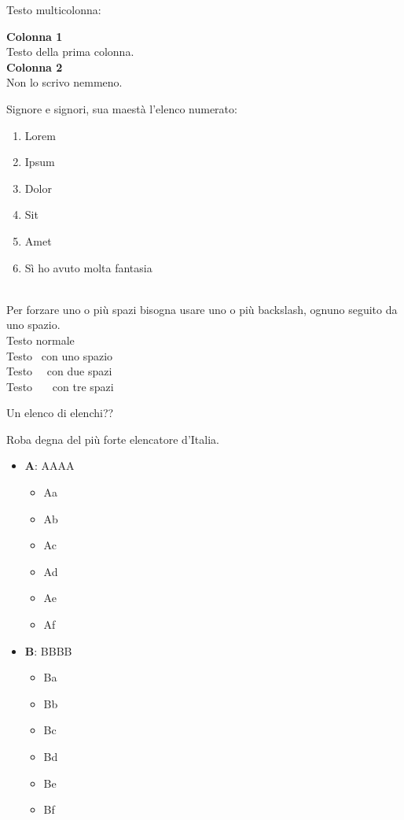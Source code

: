 \documentclass[envcountsame,envcountchap]{svmono}
\begin{document}
\vspace{0.5cm}



Testo multicolonna: 

\begin{multicols}{2}
    \textbf{Colonna 1}\\
    Testo della prima colonna.
\columnbreak\\
    \textbf{Colonna 2}\\
    Non lo scrivo nemmeno.
\end{multicols}


Signore e signori, sua maestà l'elenco numerato:
\begin{enumerate}
    \item Lorem
    \item Ipsum
    \item Dolor
    \item Sit
    \item Amet
    \item Sì ho avuto molta fantasia
\end{enumerate} 

\ \\

Per forzare uno o più spazi bisogna usare uno o più backslash, ognuno seguito da uno spazio.\\
Testo normale\\
Testo \ con uno spazio\\
Testo \ \ con due spazi\\
Testo \ \ \ con tre spazi

Un elenco di elenchi??

Roba degna del più forte elencatore d'Italia. \citep{elencatoreSeriale}
\begin{itemize}
    \item \textbf{A}: AAAA
    \begin{itemize}
        \item Aa
        \item Ab
        \item Ac
        \item Ad
        \item Ae
        \item Af
    \end{itemize} 
    \item \textbf{B}: BBBB
    \begin{itemize}
        \item Ba
        \item Bb
        \item Bc
        \item Bd
        \item Be
        \item Bf
    \end{itemize}
\end{itemize}
\end{document}
